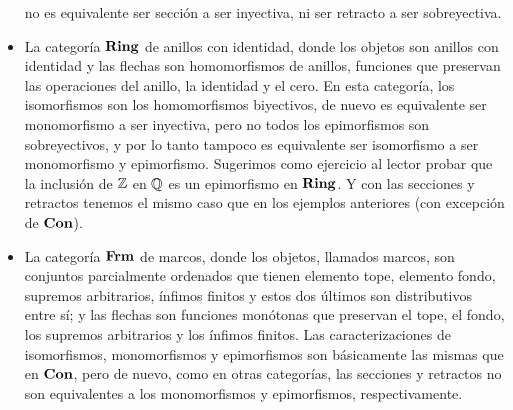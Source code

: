 \documentclass{comunicaciones}
\begin{document}
\begin{ej}
\begin{itemize}
        no es equivalente ser sección a ser inyectiva, ni ser retracto a ser sobreyectiva.
        \item La categoría $\mathbf{Ring}$ de anillos con identidad, donde los objetos son anillos con identidad y las flechas son homomorfismos de anillos, funciones
        que preservan las operaciones del anillo, la identidad y el cero. En esta categoría, los isomorfismos son los homomorfismos biyectivos, de nuevo es
        equivalente ser monomorfismo a ser inyectiva, pero no todos los epimorfismos son sobreyectivos, y por lo tanto tampoco es equivalente ser isomorfismo
        a ser monomorfismo y epimorfismo. Sugerimos como ejercicio al lector probar que la inclusión de $\mathbb Z$ en $\mathbb Q$ es un epimorfismo en $\mathbf{Ring}$. Y con las secciones y
        retractos tenemos el mismo caso que en los ejemplos anteriores (con excepción de $\mathbf{Con}$).
        \item La categoría $\mathbf{Frm}$ de marcos, donde los objetos, llamados marcos, son conjuntos parcialmente ordenados que tienen elemento tope, elemento fondo, supremos arbitrarios,
        ínfimos finitos y estos dos últimos son distributivos entre sí; y las flechas son funciones monótonas que preservan el tope, el fondo, los supremos arbitrarios
        y los ínfimos finitos. Las caracterizaciones de isomorfismos, monomorfismos y epimorfismos son básicamente las mismas que en $\mathbf{Con}$, pero de nuevo,
        como en otras categorías, las secciones y retractos no son equivalentes a los monomorfismos y epimorfismos, respectivamente.
    \end{itemize}
\end{ej}
\end{document}
